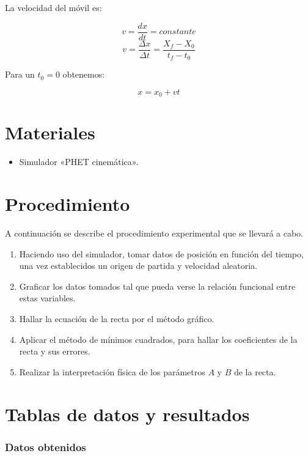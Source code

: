 \documentclass[letter,11pt]{article}
\begin{document}
La velocidad del móvil es:

\begin{equation*}
    v = \frac{dx}{dt}=constante
\end{equation*}
\begin{equation*}
    v = \frac{\Delta x}{\Delta t}=\frac{X_f-X_0}{t_f-t_0}
\end{equation*}

Para un $t_0=0$ obtenemos:

\begin{equation*}
    x = x_0 + vt
\end{equation*}

\section{Materiales}
\begin{itemize}
\item Simulador «PHET cinemática».
\end{itemize}

\section{Procedimiento}
A continuación se describe el procedimiento experimental que se llevará a
cabo.

\begin{enumerate}
\item Haciendo uso del simulador, tomar datos de posición en función del tiempo,
    una vez establecidos un origen de partida y velocidad aleatoria.
\item Graficar los datos tomados tal que pueda verse la relación funcional entre
    estas variables.
\item Hallar la ecuación de la recta por el método gráfico.
\item Aplicar el método de mínimos cuadrados, para hallar los coeficientes de la
    recta y sus errores.
\item Realizar la interpretación física de los parámetros $A$ y $B$ de la recta.
\end{enumerate}

\section{Tablas de datos y resultados}

\subsubsection{Datos obtenidos}
\end{document}
